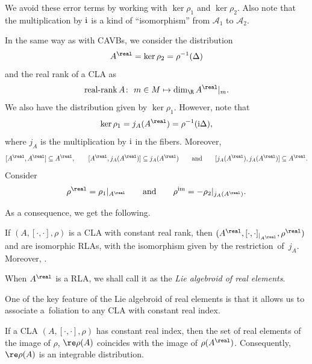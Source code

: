 We avoid these error terms by working with $\ker\rho_1$ and $\ker\rho_2$. Also note that the multiplication by ${\rm i}$ is a kind of ``isomorphism'' from $\mathcal{A}_1$ to $\mathcal{A}_2$.

In the same way as with CAVBs, we consider the distribution
\[
A^{\real}=\ker \rho_2=\rho^{-1}(\Delta)
\]
and the real rank of a CLA as
\[\operatorname{\text{real-rank}} A\colon \ m\in M\mapsto \dim_{\R} A^{\real}|_m.\]
We also have the distribution given by $\ker\rho_1$. However, note that
\[\ker\rho_1=j_A(A^{\real})=\rho^{-1}({\rm i}\Delta),\]
 where $j_A$ is the multiplication by ${\rm i}$ in the fibers. Moreover,
\begin{equation}\label{id_1}
[A^{\real}, A^{\real}]\subseteq A^{\real},\qquad[A^{\real}, j_A(A^{\real})]\subseteq j_A(A^{\real})\qquad\text{and}\qquad [j_A(A^{\real}), j_A(A^{\real})]\subseteq A^{\real}.
\end{equation}
 Consider
 \[\rho^{\real}=\rho_1|_{A^{\real}}\qquad \text{and}\qquad \rho^{{\rm im}}=-\rho_2|_{j_A(A^{\real})}.\]

As a consequence, we get the following.
 \begin{Proposition}
 If $(A, [\cdot, \cdot], \rho)$ is a CLA with constant real rank, then $(A^{\real}, [\cdot, \cdot]_{|_{A^{\real}}}, \rho^{\real})$ and
  are isomorphic RLAs, with the isomorphism given by the restric\-tion~of~$j_A$. Moreover, .
 \end{Proposition}

 {\samepage \begin{Definition}
 When $A^{\real}$ is a RLA, we shall call it as the {\em Lie algebroid of real elements}.
 \end{Definition}

 One of the key feature of the Lie algebroid of real elements is that it allows us to associate a~foliation to any CLA with constant real index.
 \begin{Corollary}
 If a CLA $(A, [\cdot, \cdot], \rho)$ has constant real index, then the set of real elements of the image of $\rho$, $\re\rho(A)$ coincides with the image of $\rho(A^{\real})$. Consequently, $\re\rho(A)$ is an integrable distribution.
 \end{Corollary}

 }

